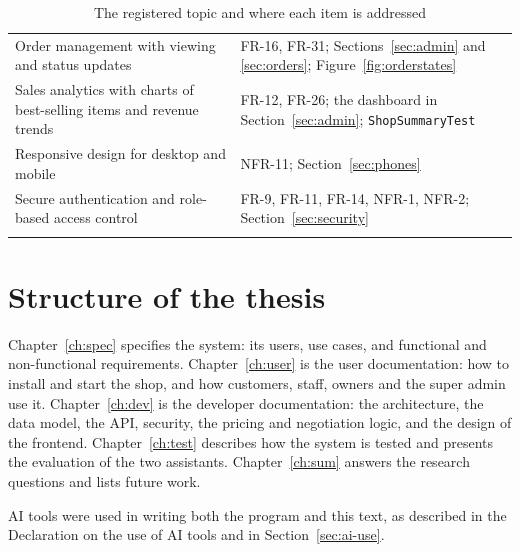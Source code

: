 {\begin{longtable}{>{\raggedright\arraybackslash}p{5.2cm} >{\raggedright\arraybackslash}p{8.3cm}}
	Order management with viewing and status updates &
	FR-16, FR-31; Sections~\ref{sec:admin} and \ref{sec:orders}; Figure~\ref{fig:orderstates} \\
	Sales analytics with charts of best-selling items and revenue trends &
	FR-12, FR-26; the dashboard in Section~\ref{sec:admin}; \texttt{ShopSummaryTest} \\
	Responsive design for desktop and mobile &
	NFR-11; Section~\ref{sec:phones} \\
	Secure authentication and role-based access control &
	FR-9, FR-11, FR-14, NFR-1, NFR-2; Section~\ref{sec:security} \\
	\bottomrule
	\caption{The registered topic and where each item is addressed}
	\label{tab:registered}
\end{longtable}
}

\section{Structure of the thesis}

Chapter~\ref{ch:spec} specifies the system: its users, use cases, and functional and non-functional requirements.
Chapter~\ref{ch:user} is the user documentation: how to install and start the shop, and how customers, staff, owners and
the super admin use it. Chapter~\ref{ch:dev} is the developer documentation: the architecture, the data model, the API,
security, the pricing and negotiation logic, and the design of the frontend. Chapter~\ref{ch:test} describes how the
system is tested and presents the evaluation of the two assistants. Chapter~\ref{ch:sum} answers the research questions
and lists future work.

\ifaideclaration
AI tools were used in writing both the program and this text, as described in the Declaration on the use of AI tools
and in Section~\ref{sec:ai-use}.
\fi
